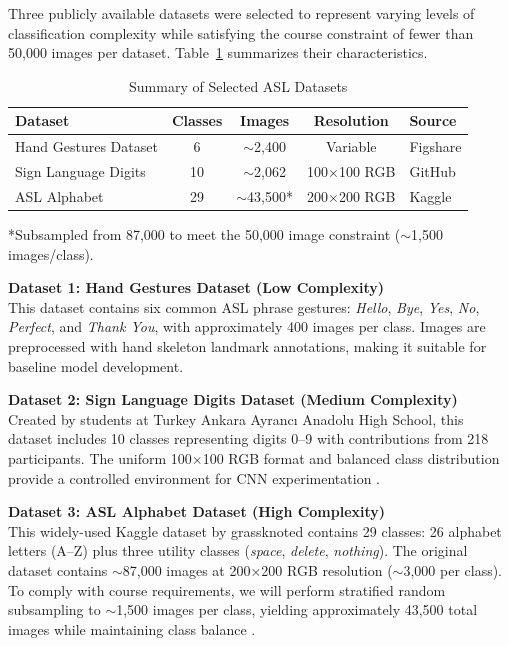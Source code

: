 \documentclass[11pt,a4paper]{article}
\begin{document}
Three publicly available datasets were selected to represent varying levels of classification complexity while satisfying the course constraint of fewer than 50,000 images per dataset. Table~\ref{tab:datasets} summarizes their characteristics.

\begin{table}[h]
\centering
\caption{Summary of Selected ASL Datasets}
\label{tab:datasets}
\begin{tabular}{@{}lcccl@{}}
\toprule
\textbf{Dataset} & \textbf{Classes} & \textbf{Images} & \textbf{Resolution} & \textbf{Source} \\
\midrule
Hand Gestures Dataset & 6 & $\sim$2,400 & Variable & Figshare \cite{handgestures2023} \\
Sign Language Digits & 10 & $\sim$2,062 & 100$\times$100 RGB & GitHub \cite{ardamavi2020} \\
ASL Alphabet & 29 & $\sim$43,500* & 200$\times$200 RGB & Kaggle \cite{grassknoted2018} \\
\bottomrule
\end{tabular}
\end{table}
\small{*Subsampled from 87,000 to meet the 50,000 image constraint ($\sim$1,500 images/class).}
\normalsize

\textbf{Dataset 1: Hand Gestures Dataset (Low Complexity)} \\
This dataset contains six common ASL phrase gestures: \textit{Hello}, \textit{Bye}, \textit{Yes}, \textit{No}, \textit{Perfect}, and \textit{Thank You}, with approximately 400 images per class. Images are preprocessed with hand skeleton landmark annotations, making it suitable for baseline model development.

\textbf{Dataset 2: Sign Language Digits Dataset (Medium Complexity)} \\
Created by students at Turkey Ankara Ayrancı Anadolu High School, this dataset includes 10 classes representing digits 0--9 with contributions from 218 participants. The uniform 100$\times$100 RGB format and balanced class distribution provide a controlled environment for CNN experimentation \cite{ardamavi2020}.

\textbf{Dataset 3: ASL Alphabet Dataset (High Complexity)} \\
This widely-used Kaggle dataset by grassknoted contains 29 classes: 26 alphabet letters (A--Z) plus three utility classes (\textit{space}, \textit{delete}, \textit{nothing}). The original dataset contains $\sim$87,000 images at 200$\times$200 RGB resolution ($\sim$3,000 per class). To comply with course requirements, we will perform stratified random subsampling to $\sim$1,500 images per class, yielding approximately 43,500 total images while maintaining class balance \cite{grassknoted2018}.
\end{document}
